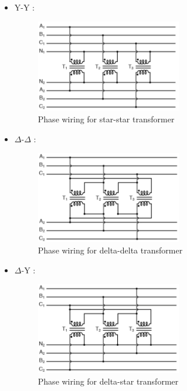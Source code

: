 \documentclass[12pt,a4paper]{report}
\begin{document}
\begin{itemize}
    \item Y-Y :
    
    \begin{figure}[h]
    \centering
    \includegraphics[width=0.6\textwidth]{y-y.PNG}
    \caption{Phase wiring for star-star transformer}
    \label{fig:star-star transformer}
    \end{figure}
    
    \item $\Delta$-$\Delta$ :
       
    \begin{figure}[h]
    \centering
    \includegraphics[width=0.6\textwidth]{delta-delta.PNG}
    \caption{Phase wiring for delta-delta transformer}
    \label{fig:delta-delta transformer}
    \end{figure}
    
    \item $\Delta$-Y :
       
    \begin{figure}[h]
    \centering
    \includegraphics[width=0.6\textwidth]{delta-y.PNG}
    \caption{Phase wiring for delta-star transformer}
    \label{fig:delta-star transformer}
    \end{figure}
    

\end{itemize}
\end{document}
